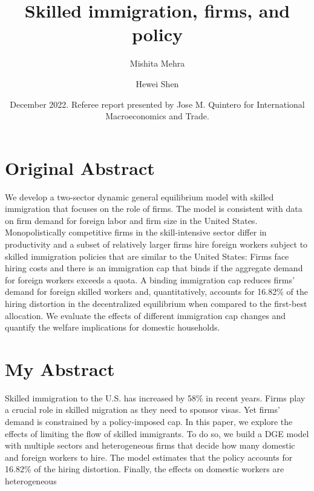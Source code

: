 \documentclass[12pt,oneside,reqno]{amsart}
\title{Skilled immigration, firms, and policy}
\author{Mishita Mehra \and Hewei Shen}
\date{December 2022. Referee report presented by Jose M. Quintero for International Macroeconomics and Trade.}
\begin{document}
\maketitle 

\section{Original Abstract}
We develop a two-sector dynamic general equilibrium model with skilled immigration that focuses on the role of firms. The model is consistent with data on firm demand for foreign labor and firm size in the United States. Monopolistically competitive firms in the skill-intensive sector differ in productivity and a subset of relatively larger firms hire foreign workers subject to skilled immigration policies that are similar to the United States: Firms face hiring costs and there is an immigration cap that binds if the aggregate demand for foreign workers exceeds a quota. A binding immigration cap reduces firms’ demand for foreign skilled workers and, quantitatively, accounts for 16.82\% of the hiring distortion in the decentralized equilibrium when compared to the first-best allocation. We evaluate the effects of different immigration cap changes and quantify the welfare implications for domestic households.

\section{My Abstract}
Skilled immigration to the U.S. has increased by 58\% in recent years. Firms play a crucial role in skilled migration as they need to sponsor visas. Yet firms' demand is constrained by a policy-imposed cap. In this paper, we explore the effects of limiting the flow of skilled immigrants. To do so, we build a DGE model with multiple sectors and heterogeneous firms that decide how many domestic and foreign workers to hire. The model estimates that the policy accounts for 16.82\% of the hiring distortion. Finally, the effects on domestic workers are heterogeneous
\end{document}
